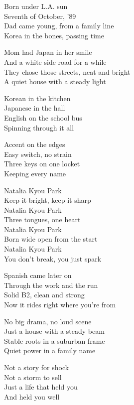 \begin{lyrics}
Born under L.A. sun\\
Seventh of October, ’89\\
Dad came young, from a family line\\
Korea in the bones, passing time

Mom had Japan in her smile\\
And a white side road for a while\\
They chose those streets, neat and bright\\
A quiet house with a steady light

Korean in the kitchen\\
Japanese in the hall\\
English on the school bus\\
Spinning through it all

Accent on the edges\\
Easy switch, no strain\\
Three keys on one locket\\
Keeping every name

Natalia Kyou Park\\
Keep it bright, keep it sharp\\
Natalia Kyou Park\\
Three tongues, one heart\\
Natalia Kyou Park\\
Born wide open from the start\\
Natalia Kyou Park\\
You don’t break, you just spark

Spanish came later on\\
Through the work and the run\\
Solid B2, clean and strong\\
Now it rides right where you’re from

No big drama, no loud scene\\
Just a house with a steady beam\\
Stable roots in a suburban frame\\
Quiet power in a family name

Not a story for shock\\
Not a storm to sell\\
Just a life that held you\\
And held you well


\end{lyrics}
